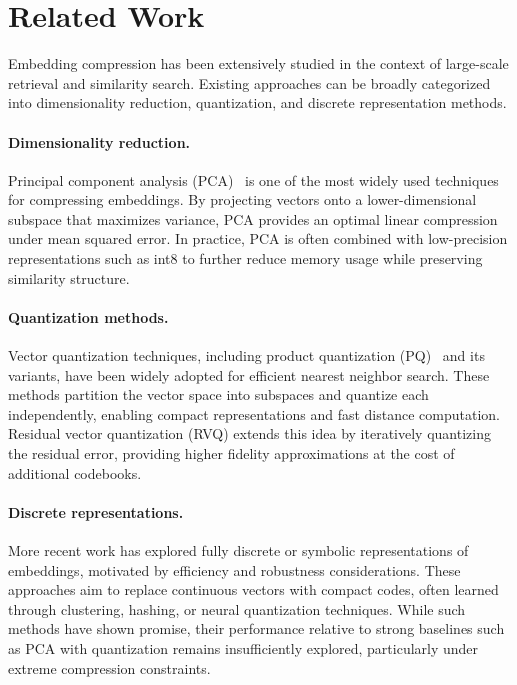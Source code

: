 \documentclass{article}
\begin{document}
\section{Related Work}

Embedding compression has been extensively studied in the context of large-scale retrieval and similarity search. Existing approaches can be broadly categorized into dimensionality reduction, quantization, and discrete representation methods.

\paragraph{Dimensionality reduction.}
Principal component analysis (PCA)~\cite{pca} is one of the most widely used techniques for compressing embeddings. By projecting vectors onto a lower-dimensional subspace that maximizes variance, PCA provides an optimal linear compression under mean squared error. In practice, PCA is often combined with low-precision representations such as int8 to further reduce memory usage while preserving similarity structure.

\paragraph{Quantization methods.}
Vector quantization techniques, including product quantization (PQ)~\cite{pq} and its variants, have been widely adopted for efficient nearest neighbor search. These methods partition the vector space into subspaces and quantize each independently, enabling compact representations and fast distance computation. Residual vector quantization (RVQ) extends this idea by iteratively quantizing the residual error, providing higher fidelity approximations at the cost of additional codebooks.

\paragraph{Discrete representations.}
More recent work has explored fully discrete or symbolic representations of embeddings, motivated by efficiency and robustness considerations. These approaches aim to replace continuous vectors with compact codes, often learned through clustering, hashing, or neural quantization techniques. While such methods have shown promise, their performance relative to strong baselines such as PCA with quantization remains insufficiently explored, particularly under extreme compression constraints.
\end{document}

